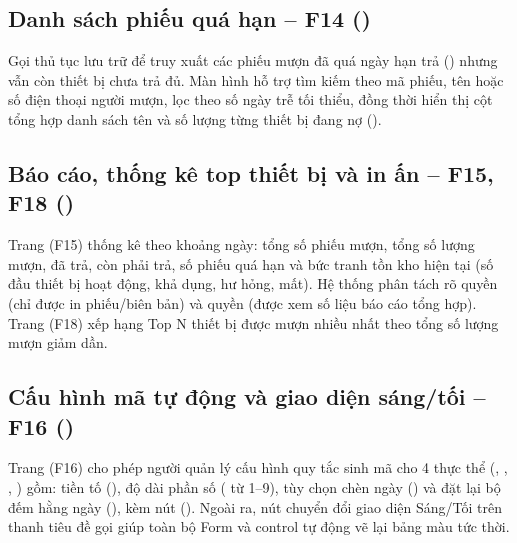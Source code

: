 \subsection{Danh sách phiếu quá hạn – F14 (\texorpdfstring{}{OverduePage.cs})}

Gọi thủ tục lưu trữ  để truy xuất các phiếu mượn đã quá ngày hạn trả () nhưng vẫn còn thiết bị chưa trả đủ. Màn hình hỗ trợ tìm kiếm theo mã phiếu, tên hoặc số điện thoại người mượn, lọc theo số ngày trễ tối thiểu, đồng thời hiển thị cột tổng hợp danh sách tên và số lượng từng thiết bị đang nợ ().


\subsection{Báo cáo, thống kê top thiết bị và in ấn – F15, F18 (\texorpdfstring{}{ReportPage.cs})}

Trang  (F15) thống kê theo khoảng ngày: tổng số phiếu mượn, tổng số lượng mượn, đã trả, còn phải trả, số phiếu quá hạn và bức tranh tồn kho hiện tại (số đầu thiết bị hoạt động, khả dụng, hư hỏng, mất). Hệ thống phân tách rõ quyền  (chỉ được in phiếu/biên bản) và quyền  (được xem số liệu báo cáo tổng hợp). Trang  (F18) xếp hạng Top N thiết bị được mượn nhiều nhất theo tổng số lượng mượn giảm dần.


\subsection{Cấu hình mã tự động và giao diện sáng/tối – F16 (\texorpdfstring{}{CodeConfigPage.cs})}

Trang  (F16) cho phép người quản lý cấu hình quy tắc sinh mã cho 4 thực thể (, , , ) gồm: tiền tố (), độ dài phần số ( từ 1–9), tùy chọn chèn ngày () và đặt lại bộ đếm hằng ngày (), kèm nút  (). Ngoài ra, nút chuyển đổi giao diện Sáng/Tối trên thanh tiêu đề  gọi  giúp toàn bộ Form và control tự động vẽ lại bảng màu tức thời.


